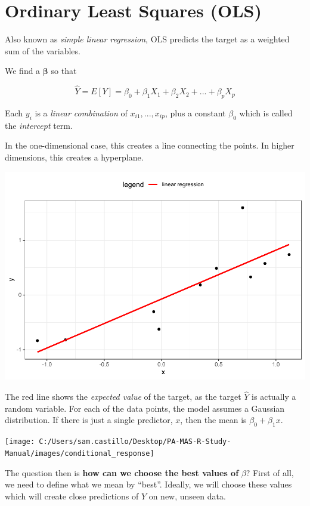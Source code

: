\documentclass[
  openany]{book}
\begin{document}
\hypertarget{ordinary-least-squares-ols}{%
\section{Ordinary Least Squares (OLS)}\label{ordinary-least-squares-ols}}

Also known as \emph{simple linear regression}, OLS predicts the target as a weighted sum of the variables.

We find a \(\mathbf{\beta}\) so that

\[
\hat{Y} = E[Y] =  \beta_0 + \beta_1 X_1 + \beta_2 X_2 + ... + \beta_p X_p
\]

Each \(y_i\) is a \emph{linear combination} of \(x_{i1}, ..., x_{ip}\), plus a constant \(\beta_0\) which is called the \emph{intercept} term.

In the one-dimensional case, this creates a line connecting the points. In higher dimensions, this creates a hyperplane.

\includegraphics{05-linear-models_files/figure-latex/unnamed-chunk-2-1.pdf}

The red line shows the \emph{expected value} of the target, as the target \(\hat{Y}\) is actually a random variable. For each of the data points, the model assumes a Gaussian distribution. If there is just a single predictor, \(x\), then the mean is \(\beta_0 + \beta_1 x\).

\begin{center}\texttt{[image: C:/Users/sam.castillo/Desktop/PA-MAS-R-Study-Manual/images/conditional\_response]} \end{center}

The question then is \textbf{how can we choose the best values of} \(\beta?\) First of all, we need to define what we mean by ``best''. Ideally, we will choose these values which will create close predictions of \(Y\) on new, unseen data.
\end{document}
